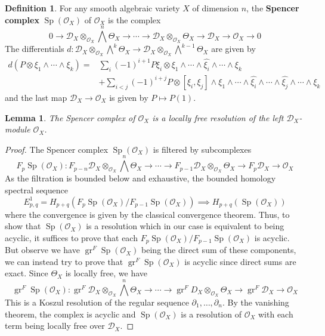 \documentclass[11pt, a4paper]{article}
\newtheorem{lemma}[theorem]{Lemma}
\theoremstyle{definition}
\newtheorem{definition}[theorem]{Definition}
\newcommand{\gr}{\operatorname{gr}}
\newcommand{\Sp}{\operatorname{Sp}}
\begin{document}
    \begin{definition}
        For any smooth algebraic variety $X$ of dimension $n$, the \textbf{Spencer complex} $\Sp(\mathcal O_X)$ of $\mathcal O_X$ is the complex
        \[0\to \mathcal D_X\otimes_{\mathcal O_X}\bigwedge^n\Theta_X\to\cdots\to\mathcal D_X\otimes_{\mathcal O_X}\Theta_X\to \mathcal D_X\to\mathcal O_X\to 0\]
        The differentials $d:\mathcal D_X\otimes_{\mathcal O_X}\bigwedge^k\Theta_X\to \mathcal D_X\otimes_{\mathcal O_X}\bigwedge^{k-1}\Theta_X$ are given by
        \begin{align*}
            d(P\otimes \xi_1\wedge\cdots\wedge\xi_k)=&\sum_i(-1)^{i+1}P\xi_i\otimes\xi_1\wedge\cdots\wedge\hat{\xi_i}\wedge\cdots\wedge\xi_k\\
            &+\sum_{i<j}(-1)^{i+j}P\otimes[\xi_i,\xi_j]\wedge\xi_1\wedge\cdots\wedge\hat{\xi_i}\wedge\cdots\wedge\hat{\xi_j}\wedge\cdots\wedge\xi_k
        \end{align*}
        and the last map $\mathcal D_X\to\mathcal O_X$ is given by $P\mapsto P(1)$.
    \end{definition}
    \begin{lemma}
        The Spencer complex of $\mathcal O_X$ is a locally free resolution of the left $\mathcal D_X$-module $\mathcal O_X$.
    \end{lemma}
    \begin{proof}
        The Spencer complex $\Sp(\mathcal O_X)$ is filtered by subcomplexes
        \[F_p\Sp(\mathcal O_X):F_{p-n}\mathcal D_X\otimes_{\mathcal O_X}\bigwedge^n\Theta_X\to\cdots\to F_{p-1}\mathcal D_X\otimes_{\mathcal O_X}\Theta_X\to F_{p}\mathcal D_X\to\mathcal O_X\]
        As the filtration is bounded below and exhaustive, the bounded homology spectral sequence 
        \[E_{p,q}^1=H_{p+q}(F_p\Sp(\mathcal O_X)/F_{p-1}\Sp(\mathcal O_X))\implies H_{p+q}(\Sp(\mathcal O_X))\] where the convergence is given by the classical convergence theorem. Thus, to show that $\Sp(\mathcal O_X)$ is a resolution which in our case is equivalent to being acyclic, it suffices to prove that each $F_p\Sp(\mathcal O_X)/F_{p-1}\Sp(\mathcal O_X)$ is acyclic. But observe we have $\gr^F\Sp(\mathcal O_X)$ being the direct sum of these components, we can instead try to prove that $\gr^F\Sp(\mathcal O_X)$ is acyclic since direct sums are exact. Since $\Theta_X$ is locally free, we have
        \[\gr^F\Sp(\mathcal O_X):\gr^F\mathcal D_X\otimes_{\mathcal O_X}\bigwedge^n\Theta_X\to\cdots\to \gr^F D_X\otimes_{\mathcal O_X}\Theta_X\to \gr^F\mathcal D_X\to\mathcal O_X\]
        This is a Koszul resolution of the regular sequence $\partial_1,\dots,\partial_n$. By the vanishing theorem, the complex is acyclic and $\Sp(\mathcal O_X)$ is a resolution of $\mathcal O_X$ with each term being locally free over $\mathcal D_X$.
    \end{proof}
\end{document}
